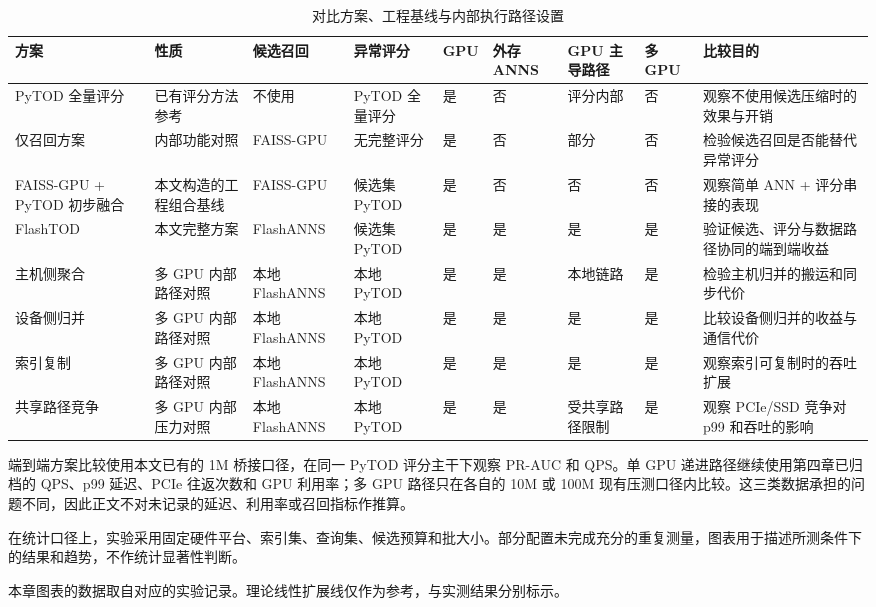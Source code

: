 \begin{table}[htbp]
  \caption{对比方案、工程基线与内部执行路径设置}
  \label{tab:baseline-settings}
  \centering
  \scriptsize
  \setlength{\tabcolsep}{1.0pt}
  \renewcommand{\arraystretch}{1.16}
  \begin{tabularx}{\linewidth}{@{}P{1.90cm}P{1.90cm}P{1.55cm}P{1.55cm}C{0.55cm}C{0.75cm}P{1.35cm}C{0.75cm}Y@{}}
    \toprule
    方案 & 性质 & 候选召回 & 异常评分 & GPU & 外存 ANNS & GPU 主导路径 & 多 GPU & 比较目的\\
    \midrule
    PyTOD 全量评分 & 已有评分方法参考 & 不使用 & PyTOD 全量评分 & 是 & 否 & 评分内部 & 否 & 观察不使用候选压缩时的效果与开销\\
    仅召回方案 & 内部功能对照 & FAISS-GPU & 无完整评分 & 是 & 否 & 部分 & 否 & 检验候选召回是否能替代异常评分\\
    FAISS-GPU + PyTOD 初步融合 & 本文构造的工程组合基线 & FAISS-GPU & 候选集 PyTOD & 是 & 否 & 否 & 否 & 观察简单 ANN + 评分串接的表现\\
    FlashTOD & 本文完整方案 & FlashANNS & 候选集 PyTOD & 是 & 是 & 是 & 是 & 验证候选、评分与数据路径协同的端到端收益\\
    主机侧聚合 & 多 GPU 内部路径对照 & 本地 FlashANNS & 本地 PyTOD & 是 & 是 & 本地链路 & 是 & 检验主机归并的搬运和同步代价\\
    设备侧归并 & 多 GPU 内部路径对照 & 本地 FlashANNS & 本地 PyTOD & 是 & 是 & 是 & 是 & 比较设备侧归并的收益与通信代价\\
    索引复制 & 多 GPU 内部路径对照 & 本地 FlashANNS & 本地 PyTOD & 是 & 是 & 是 & 是 & 观察索引可复制时的吞吐扩展\\
    共享路径竞争 & 多 GPU 内部压力对照 & 本地 FlashANNS & 本地 PyTOD & 是 & 是 & 受共享路径限制 & 是 & 观察 PCIe/SSD 竞争对 p99 和吞吐的影响\\
    \bottomrule
  \end{tabularx}
\end{table}

端到端方案比较使用本文已有的 1M 桥接口径，在同一 PyTOD 评分主干下观察 PR-AUC 和 QPS。单 GPU 递进路径继续使用第四章已归档的 QPS、p99 延迟、PCIe 往返次数和 GPU 利用率；多 GPU 路径只在各自的 10M 或 100M 现有压测口径内比较。这三类数据承担的问题不同，因此正文不对未记录的延迟、利用率或召回指标作推算。

在统计口径上，实验采用固定硬件平台、索引集、查询集、候选预算和批大小。部分配置未完成充分的重复测量，图表用于描述所测条件下的结果和趋势，不作统计显著性判断。

本章图表的数据取自对应的实验记录。理论线性扩展线仅作为参考，与实测结果分别标示。

